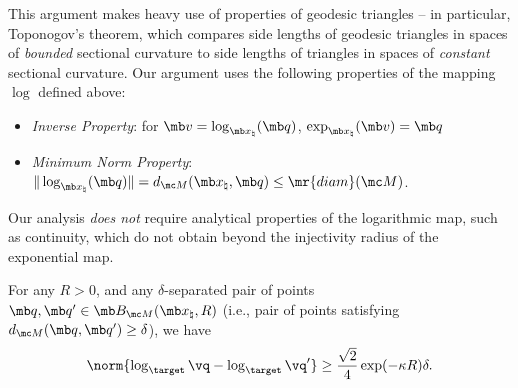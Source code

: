 {This argument makes heavy use of properties of geodesic triangles -- in particular, Toponogov's theorem, which compares side lengths of geodesic triangles in spaces of {\em bounded} sectional curvature to side lengths of triangles in spaces of {\em constant} sectional curvature. Our argument uses the following properties of the mapping $\log$ defined above: 
\begin{itemize}
    \item {\em Inverse Property}: for $\mb v = \log_{\mb x_\natural}(\mb q)$, $\exp_{\mb x_\natural}(\mb v) = \mb q$
    \item {\em Minimum Norm Property}: $\| \log_{\mb x_\natural}(\mb q) \| = d_{\mc M}(\mb x_\natural, \mb q) \le \mr{diam}(\mc M)$.
\end{itemize}
Our analysis {\em does not} require analytical properties of the logarithmic map, such as continuity, which do not obtain beyond the injectivity radius of the exponential map. 


}



\begin{lemma}\label{lemma:tangent space seperation}
    For any $R > 0$, and any $\delta$-separated pair of points $\mb q, \mb q' \in \mb B_{\mc M}(\mb x_\natural, R)$ (i.e., pair of points satisfying $d_{\mc M}(\mb q,\mb q') \geq \delta$), we have 
    \begin{align}
        \norm{\log_{\target}\vq - \log_{\target}\vq'} \ge \frac{\sqrt{2}}{4}\exp(-\kappa R)\delta. 
    \end{align}
\end{lemma}



